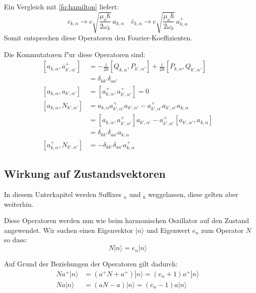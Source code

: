 Ein Vergleich mit \ref{fq:hamilton} liefert:
\begin{equation} \label{fq:opp_fourier}
 c_{k,\alpha} \rightarrow c \sqrt{\frac{\mu_o \hbar}{2 \omega_k}} \, a_{k,\alpha} \quad \bar{c}_{k,\alpha} \rightarrow c \sqrt{\frac{\mu_o \hbar}{2 \omega_k}} \, a^+_{k,\alpha}
\end{equation}
Somit entsprechen diese Operatoren den Fourier-Koeffizienten.

Die Kommutatoren f"ur diese Operatoren sind:
\begin{equation}
\begin{split}
[a_{k,\alpha} , a^+_{k',\alpha'}] &= - \frac{i}{2 \hbar} [Q_{k,\alpha}, P_{k',\alpha'}] + \frac{i}{2 \hbar} [P_{k,\alpha}, Q_{k',\alpha'}] \\
	 &= \delta_{kk'}\delta_{aa'} \\
[a_{k,\alpha} , a_{k',\alpha'}] &= [a^+_{k,\alpha} , a^+_{k',\alpha'}] = 0 \\
[a_{k,\alpha} , N_{k',\alpha'}] &= a_{k,\alpha} a^+_{k',\alpha'} a_{k',\alpha'} - a^+_{k',\alpha'} a_{k',\alpha'} a_{k,\alpha} \\
	&= [a_{k,\alpha} , a^+_{k',\alpha'}]a_{k',\alpha'} - a^+_{k',\alpha'}[a_{k',\alpha'} , a_{k,\alpha}]\\
	&= \delta_{kk'}\delta_{aa'} a_{k,\alpha} \\
[a^+_{k,\alpha} , N_{k',\alpha'}] &= -\delta_{kk'}\delta_{aa'} a^+_{k,\alpha}
\end{split}
\end{equation}

\subsection{Wirkung auf Zustandsvektoren}

In diesem Unterkapitel werden Suffixes $_n$ und $_k$ weggelassen, diese gelten aber weiterhin. 

Diese Operatoren werden nun wie beim harmonischen Oszillator auf den Zustand angewendet. Wir suchen einen Eigenvektor $|n\rangle$ und Eigenwert $e_n$ zum Operator $N$ so dass:
\begin{equation}
N|n\rangle = e_n|n\rangle
\end{equation}

Auf Grund der Beziehungen der Operatoren gilt dadurch:
\begin{equation}
\begin{split}
Na^+|n\rangle &= (a^+N + a^+)|n\rangle = (e_n + 1)a^+|n\rangle \\
Na|n\rangle &= (aN - a)|n\rangle = (e_n - 1)a|n\rangle
\end{split}
\end{equation}

